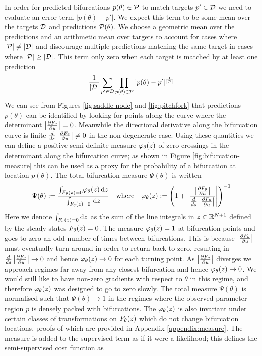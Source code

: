 In order for predicted bifurcations $p(\theta)\in\mathcal{P}$ to match targets $p'\in\mathcal{D}$ we need to evaluate an error term $|p(\theta)-p'|$. We expect this term to be some mean over the targets $\mathcal{D}$ and predictions $\mathcal{P}(\theta)$. We choose a geometric mean over the predictions and an arithmetic mean over targets to account for cases where $|\mathcal{P}|\neq|\mathcal{D}|$ and discourage multiple predictions matching the same target in cases where $|\mathcal{P}|\geq|\mathcal{D}|$. This term only zero when each target is matched by at least one prediction
\begin{align}
    \frac{1}{|\mathcal{D}|}\sum_{p'\in\mathcal{D}}
    \prod_{p(\theta)\in\mathcal{P}}|p(\theta)-p'|
    ^{\frac{1}{|\mathcal{P}|}}
    \label{eq:supervised-term}
\end{align}
We can see from Figures \ref{fig:saddle-node} and \ref{fig:pitchfork} that predictions $p(\theta)$ can be identified by looking for points along the curve where the determinant $\left| \frac{\partial F_{\theta}}{\partial u} \right|=0$. Meanwhile the directional derivative along the bifurcation curve is finite $\frac{d}{ds}\left| \frac{\partial F_{\theta}}{\partial u} \right|\neq 0$ in the non-degenerate case. Using these quantities we can define a positive semi-definite measure $\varphi_{\theta}(z)$ of zero crossings in the determinant along the bifurcation curve; as shown in Figure \ref{fig:bifurcation-measure} this can be used as a proxy for the probability of a bifurcation at location $p(\theta)$. The total bifurcation measure $\Psi(\theta)$ is written
\begin{align}
    \Psi(\theta):=\frac{
        \int_{F_{\theta}(z)=0}\!
        \varphi_{\theta}(z)\,\mathrm{d}z
    }{
        \int_{F_{\theta}(z)=0}\!\
        \mathrm{d}z
    }
    \quad\mathrm{where}\quad
    \varphi_{\theta}(z):=
    \left(1+\left|\frac{\left| \frac{\partial F_{\theta}}{\partial u} \right|}{\frac{d}{ds}\left| \frac{\partial F_{\theta}}{\partial u} \right|}\right|\right)^{-1}
    \label{eq:measure}
\end{align}
Here we denote $\int_{F_{\theta}(z)=0}\mathrm{d}z$ as the sum of the line integrals in $z\in\mathbb{R}^{N+1}$ defined by the steady states $F_{\theta}(z)=0$. The measure $\varphi_{\theta}(z)=1$ at bifurcation points and goes to zero an odd number of times between bifurcations. This is because $\left| \frac{\partial F_{\theta}}{\partial u} \right|$ must eventually turn around in order to return back to zero, resulting in $\frac{d}{ds}\left| \frac{\partial F_{\theta}}{\partial u} \right|\rightarrow0$ and hence $\varphi_{\theta}(z)\rightarrow0$ for each turning point. As $\left| \frac{\partial F_{\theta}}{\partial u} \right|$ diverges we approach regimes far away from any closest bifurcation and hence $\varphi_{\theta}(z)\rightarrow0$. We would still like to have non-zero gradients with respect to $\theta$ in this regime, and therefore $\varphi_{\theta}(z)$ was designed to go to zero slowly. The total measure $\Psi(\theta)$ is normalised such that $\Psi(\theta)\rightarrow1$ in the regimes where the observed parameter region $p$ is densely packed with bifurcations. The $\varphi_{\theta}(z)$ is also invariant under certain classes of transformations on $F_{\theta}(z)$ which do not change bifurcation locations, proofs of which are provided in Appendix \ref{appendix:measure}. The measure is added to the supervised term as if it were a likelihood; this defines the semi-supervised cost function as
